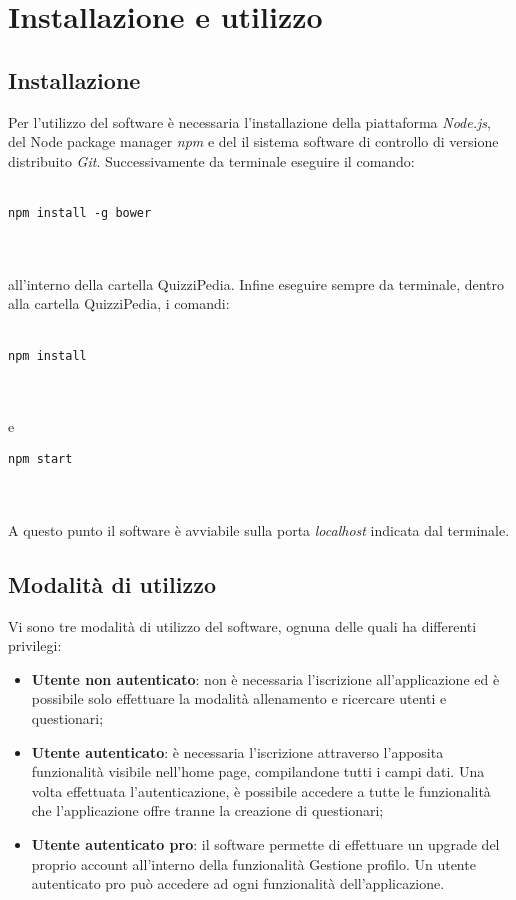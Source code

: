 \newpage
\section{Installazione e utilizzo}
\subsection{Installazione}
Per l'utilizzo del software è necessaria l'installazione della piattaforma \textit{Node.js}, del Node package manager \textit{npm} e del il sistema software di controllo di versione distribuito \textit{Git}. Successivamente da terminale eseguire il comando:\\
\\
\centerline{\texttt{npm install -g bower}}\\
\\
all'interno della cartella QuizziPedia. Infine eseguire sempre da terminale, dentro alla cartella QuizziPedia, i comandi:\\
\\
\centerline{\texttt{npm install}}\\
\\
e
\\
\centerline{\texttt{npm start}}\\
\\
A questo punto il software è avviabile sulla porta \textit{localhost} indicata dal terminale.

\subsection{Modalità di utilizzo}
Vi sono tre modalità di utilizzo del software, ognuna delle quali ha differenti privilegi:
\begin{itemize}
	\item \textbf{Utente non autenticato}: non è necessaria l'iscrizione all'applicazione ed è possibile solo effettuare la modalità allenamento e ricercare utenti e questionari;
	\item \textbf{Utente autenticato}: è necessaria l'iscrizione attraverso l'apposita funzionalità visibile nell'home page, compilandone tutti i campi dati. Una volta effettuata l'autenticazione, è possibile accedere a tutte le funzionalità che l'applicazione offre tranne la creazione di questionari;
	\item \textbf{Utente autenticato pro}: il software permette di effettuare un upgrade del proprio account all'interno della funzionalità Gestione profilo. Un utente autenticato pro può accedere ad ogni funzionalità dell'applicazione. 
\end{itemize}

